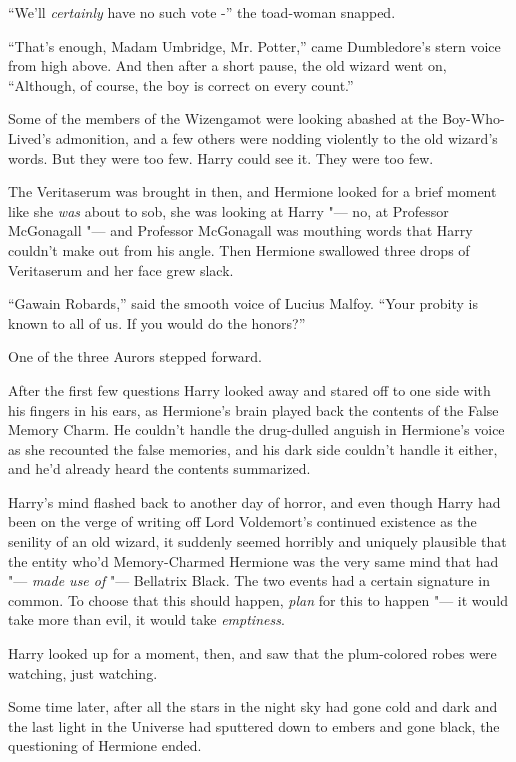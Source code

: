 ``We'll \emph{certainly} have no such vote -'' the toad-woman snapped.

``That's enough, Madam Umbridge, Mr. Potter,'' came Dumbledore's stern
voice from high above. And then after a short pause, the old wizard went
on, ``Although, of course, the boy is correct on every count.''

Some of the members of the Wizengamot were looking abashed at the
Boy-Who-Lived's admonition, and a few others were nodding violently to
the old wizard's words. But they were too few. Harry could see it. They
were too few.

The Veritaserum was brought in then, and Hermione looked for a brief
moment like she \emph{was} about to sob, she was looking at Harry "--- no,
at Professor McGonagall "--- and Professor McGonagall was mouthing words
that Harry couldn't make out from his angle. Then Hermione swallowed
three drops of Veritaserum and her face grew slack.

``Gawain Robards,'' said the smooth voice of Lucius Malfoy. ``Your
probity is known to all of us. If you would do the honors?''

One of the three Aurors stepped forward.

After the first few questions Harry looked away and stared off to one
side with his fingers in his ears, as Hermione's brain played back the
contents of the False Memory Charm. He couldn't handle the drug-dulled
anguish in Hermione's voice as she recounted the false memories, and his
dark side couldn't handle it either, and he'd already heard the contents
summarized.

Harry's mind flashed back to another day of horror, and even though
Harry had been on the verge of writing off Lord Voldemort's continued
existence as the senility of an old wizard, it suddenly seemed horribly
and uniquely plausible that the entity who'd Memory-Charmed Hermione was
the very same mind that had "--- \emph{made use of} "--- Bellatrix Black. The
two events had a certain signature in common. To choose that this should
happen, \emph{plan} for this to happen "--- it would take more than evil,
it would take \emph{emptiness}.

Harry looked up for a moment, then, and saw that the plum-colored robes
were watching, just watching.

Some time later, after all the stars in the night sky had gone cold and
dark and the last light in the Universe had sputtered down to embers and
gone black, the questioning of Hermione ended.

